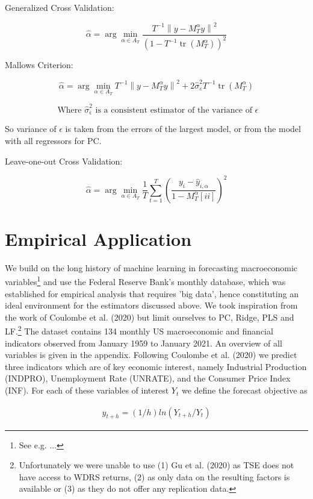 Generalized Cross Validation:

\[\hat{\alpha}=\arg \min _{\alpha \in A_{T}} \frac{T^{-1}\left\|y-M_{T}^{\alpha} y\right\|^{2}}{\left(1-T^{-1} \operatorname{tr}\left(M_{T}^{\alpha}\right)\right)^{2}}\]

Mallows Criterion:

\[\hat{\alpha}=\arg \min _{\alpha \in A_{T}} T^{-1}\left\|y-M_{T}^{\alpha} y\right\|^{2}+2 \widehat{\sigma}_{\varepsilon}^{2} T^{-1} \operatorname{tr}\left(M_{T}^{\alpha}\right)\]

\[\text{ Where } \widehat{\sigma}_{\epsilon}^{2} \text{ is a consistent estimator of the variance of } \epsilon\]

So variance of $\epsilon$ is taken from the errors of the largest model, or from the model with all regressors for PC.

Leave-one-out Cross Validation:

\[\hat{\alpha}=\arg \min _{\alpha \in A_{T}} \frac{1}{T} \sum_{t=1}^{T}\left(\frac{y_{i}-\hat{y}_{i, \alpha}}{1-M_{T}^{\alpha}[ii]}\right)^{2}\]



\clearpage

\section{Empirical Application}
We build on the long history of machine learning in forecasting macroeconomic variables\footnote{See e.g. ...} and use the Federal Reserve Bank's monthly database, which was established for empirical analysis that requires 'big data', hence constituting an ideal environment for the estimators discussed above. We took inspiration from the work of Coulombe et al. (2020) but limit ourselves to PC, Ridge, PLS and LF.\footnote{Unfortunately we were unable to use (1) Gu et al. (2020) as TSE does not have access to WDRS returns, (2) as only data on the resulting factors is available or (3) as they do not offer any replication data.} 
The dataset contains 134 monthly US macroeconomic and financial indicators observed from January 1959 to January 2021. An overview of all variables is given in the appendix. 
Following Coulombe et al. (2020) we predict three indicators which are of key economic interest, namely Industrial Production (INDPRO), Unemployment Rate (UNRATE), and the Consumer Price Index (INF). For each of these variables of interest $Y_t$ we define the forecast objective as

\begin{align}
	y_{t+h} = (1/h) ln(Y_{t+h}/Y_t)
\end{align}








